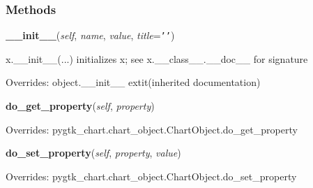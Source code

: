 
  \subsubsection{Methods}

    \vspace{0.5ex}

\hspace{.8\funcindent}\begin{boxedminipage}{\funcwidth}

    \raggedright \textbf{\_\_init\_\_}(\textit{self}, \textit{name}, \textit{value}, \textit{title}={\tt \texttt{'}\texttt{}\texttt{'}})

\setlength{\parskip}{2ex}
    x.\_\_init\_\_(...) initializes x; see x.\_\_class\_\_.\_\_doc\_\_ for 
    signature

\setlength{\parskip}{1ex}
      Overrides: object.\_\_init\_\_ 	extit{(inherited documentation)}

    \end{boxedminipage}

    \vspace{0.5ex}

\hspace{.8\funcindent}\begin{boxedminipage}{\funcwidth}

    \raggedright \textbf{do\_get\_property}(\textit{self}, \textit{property})

\setlength{\parskip}{2ex}
\setlength{\parskip}{1ex}
      Overrides: pygtk\_chart.chart\_object.ChartObject.do\_get\_property

    \end{boxedminipage}

    \vspace{0.5ex}

\hspace{.8\funcindent}\begin{boxedminipage}{\funcwidth}

    \raggedright \textbf{do\_set\_property}(\textit{self}, \textit{property}, \textit{value})

\setlength{\parskip}{2ex}
\setlength{\parskip}{1ex}
      Overrides: pygtk\_chart.chart\_object.ChartObject.do\_set\_property

    \end{boxedminipage}


